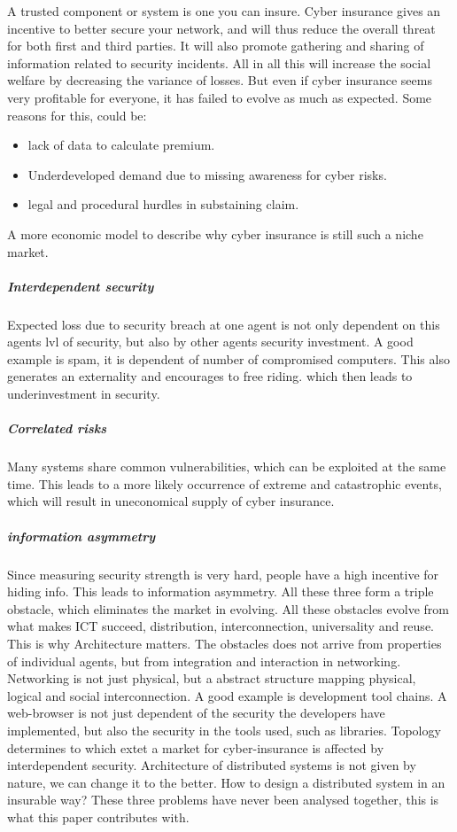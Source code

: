 \cite{bohme2010modeling}
A trusted component or system is one you can insure.
Cyber insurance gives an incentive to better secure your network, and will thus reduce the overall threat for both first and third parties. It will also promote gathering and sharing of information related to security incidents. All in all this will increase the social welfare by decreasing the variance of losses. 
But even if cyber insurance seems very profitable for everyone, it has failed to evolve as much as expected.
Some reasons for this, could be:
\begin{itemize}[topsep=-1em,parsep=0em,itemsep=0em] 
 \item lack of data to calculate premium. \item Underdeveloped demand due to missing awareness for cyber risks. \item legal and procedural hurdles in substaining claim.
\end{itemize}
A more economic model to describe why cyber insurance is still such a niche market.
\subparagraph{Interdependent security}
Expected loss due to security breach at one agent is not only dependent on this agents lvl of security,
 but also by other agents security investment. A good example is spam, it is dependent of number of compromised
  computers. This also generates an externality and encourages to free riding. which then leads to
   underinvestment in security.
\subparagraph{Correlated risks}
Many systems share common vulnerabilities, which can be exploited at the same time. 
This leads to a more likely occurrence of extreme and catastrophic events,
 which will result in uneconomical supply of cyber insurance.
\subparagraph{information asymmetry}
Since measuring security strength is very hard, 
people have a high incentive for hiding info. This leads to information asymmetry. 
All these three form a triple obstacle, which eliminates the market in evolving. 
All these obstacles evolve from what makes ICT succeed, distribution, interconnection, universality and reuse.
This is why Architecture matters. The obstacles does not arrive from properties of individual agents, 
but from integration and interaction in networking. Networking is not just physical, 
but a abstract structure mapping physical, logical and social interconnection.
 A good example is development tool chains.
  A web-browser is not just dependent of the security the developers have implemented, 
  but also the security in the tools used, such as libraries.
Topology determines to which extet a market for cyber-insurance is affected by interdependent security. Architecture of distributed systems is not given by nature, we can change it to the better.  How to design a distributed system in an insurable way?
These three problems have never been analysed together, this is what this paper contributes with. 

